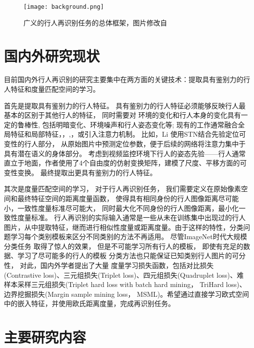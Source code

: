 \begin{figure}
	\texttt{[image: background.png]}
	\caption{广义的行人再识别任务的总体框架，图片修改自~\cite{zheng2017person}}
	\label{fig:overall}
\end{figure}

\section{国内外研究现状}

目前国内外行人再识别的研究主要集中在两方面的关键技术：提取具有鉴别力的行人特征和度量匹配空间的学习。

首先是提取具有鉴别力的行人特征。
具有鉴别力的行人特征必须能够反映行人最基本的区别于其他行人的特征，
同时需要对
环境的变化和行人本身的变化具有一定的鲁棒性,
包括明暗变化、环境噪声和行人姿态变化等;
现有的工作通常融合全局特征和局部特征\cite{reciprocal}，\cite{liu2017hydraplus}，\cite{zhao2017spindle},\cite{glad}，或引入注意力机制。
比如，Li \etal \cite{latent}使用STN结合先验定位可变性的行人部分，
从原始图片中预测定位参数，便于后续的网络将注意力集中于具有潜在语义的身体部分。
考虑到视频监控环境下行人的姿态先验——行人通常直立于地面，作者使用了4个自由度的仿射变换矩阵，建模了尺度、平移方面的可变性变换。
最终提取出更具有鉴别力的行人特征。

其次是度量匹配空间的学习，
对于行人再识别任务，
我们需要定义在原始像素空间和最终特征空间的距离度量函数，
使得具有相同身份的行人图像距离尽可能小，一致性度量标准尽可能大，
同时最大化不同身份的行人图像距离，最小化一致性度量标准。
行人再识别的实际输入通常是一些从未在训练集中出现过的行人图片，从中提取特征，继而进行相似性度量或距离度量。由于这样的特性，分类问题学习每个类别模板来区分不同类别的方法不再适用。 
尽管ImageNet时代大规模分类任务\cite{deng2009imagenet}
取得了惊人的效果，
但是不可能学习所有行人的模板，
即使有充足的数据、学习了尽可能多的行人的模板
分类方法也只能保证已知类别行人图片的可分性，
对此，国内外学者提出了大量
度量学习损失函数，包括对比损失(Contrastive loss)\cite{varior2016gated}、三元组损失(Triplet loss)\cite{schroff2015facenet}、四元组损失(Quadruplet loss)\cite{chen2017beyond}、难样本采样三元组损失(Triplet hard loss with batch hard mining， TriHard loss)\cite{hermans2017defense}、边界挖掘损失(Margin sample mining loss， MSML)\cite{xiao2017margin}。希望通过直接学习欧式空间中的嵌入特征，并使用欧氏距离度量，完成再识别任务。

\section{主要研究内容}

